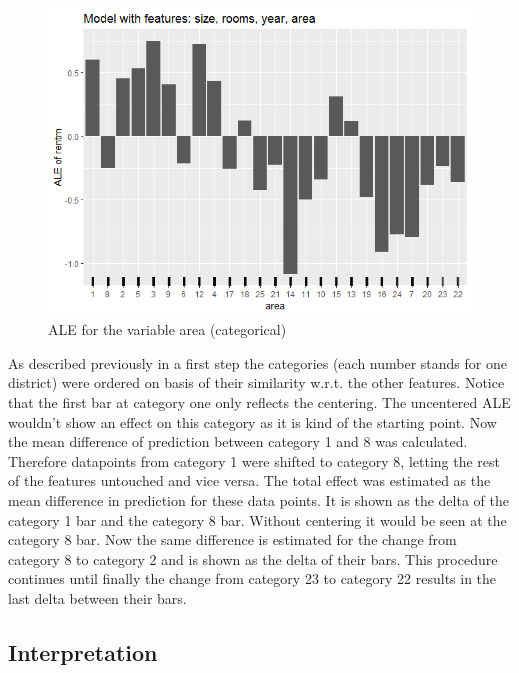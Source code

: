 \documentclass[
]{krantz}
\begin{document}
\begin{figure}
\includegraphics[width=1\linewidth]{images/ALE_2_example_cat_} \caption{ALE for the variable area (categorical)}\label{fig:ALE2catfullmod}
\end{figure}



As described previously in a first step the categories (each number stands for one district) were ordered on basis of their similarity w.r.t. the other features. Notice that the first bar at category one only reflects the centering. The uncentered ALE wouldn't show an effect on this category as it is kind of the starting point.
Now the mean difference of prediction between category 1 and 8 was calculated. Therefore datapoints from category 1 were shifted to category 8, letting the rest of the features untouched and vice versa. The total effect was estimated as the mean difference in prediction for these data points. It is shown as the delta of the category 1 bar and the category 8 bar. Without centering it would be seen at the category 8 bar. Now the same difference is estimated for the change from category 8 to category 2 and is shown as the delta of their bars.
This procedure continues until finally the change from category 23 to category 22 results in the last delta between their bars.

\hypertarget{interpretation}{%
\subsection{Interpretation}\label{interpretation}}
\end{document}
